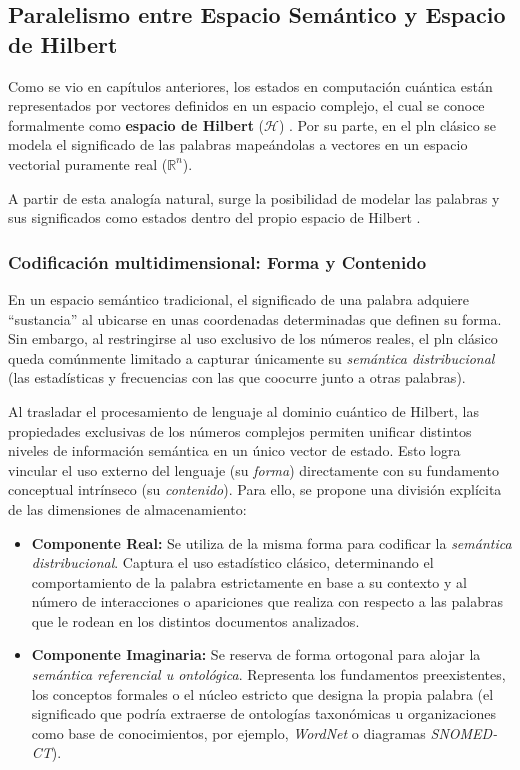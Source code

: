 \subsection{Paralelismo entre Espacio Semántico y Espacio de Hilbert}

Como se vio en capítulos anteriores, los estados en computación cuántica están representados por vectores definidos en un espacio complejo, el cual se conoce formalmente como \textbf{espacio de Hilbert} ($\mathcal{H}$) \cite{quandela_hilbert_space}. Por su parte, en el \gls{pln} clásico se modela el significado de las palabras mapeándolas a vectores en un espacio vectorial puramente real ($\mathbb{R}^n$).

A partir de esta analogía natural, surge la posibilidad de modelar las palabras y sus significados como estados dentro del propio espacio de Hilbert \cite{wittek_combining_semantics}.

\subsubsection{Codificación multidimensional: Forma y Contenido}

En un espacio semántico tradicional, el significado de una palabra adquiere ``sustancia'' al ubicarse en unas coordenadas determinadas que definen su forma. Sin embargo, al restringirse al uso exclusivo de los números reales, el \gls{pln} clásico queda comúnmente limitado a capturar únicamente su \textit{semántica distribucional} (las estadísticas y frecuencias con las que coocurre junto a otras palabras).

Al trasladar el procesamiento de lenguaje al dominio cuántico de Hilbert, las propiedades exclusivas de los números complejos permiten unificar distintos niveles de información semántica en un único vector de estado. Esto logra vincular el uso externo del lenguaje (su \textit{forma}) directamente con su fundamento conceptual intrínseco (su \textit{contenido}). Para ello, se propone una división explícita de las dimensiones de almacenamiento:

\begin{itemize}
  \item \textbf{Componente Real:} Se utiliza de la misma forma para codificar la \textit{semántica distribucional}. Captura el uso estadístico clásico, determinando el comportamiento de la palabra estrictamente en base a su contexto y al número de interacciones o apariciones que realiza con respecto a las palabras que le rodean en los distintos documentos analizados.
  \item \textbf{Componente Imaginaria:} Se reserva de forma ortogonal para alojar la \textit{semántica referencial u ontológica}. Representa los fundamentos preexistentes, los conceptos formales o el núcleo estricto que designa la propia palabra (el significado que podría extraerse de ontologías taxonómicas u organizaciones como base de conocimientos, por ejemplo, \textit{WordNet} o diagramas \textit{SNOMED-CT}).
\end{itemize}


